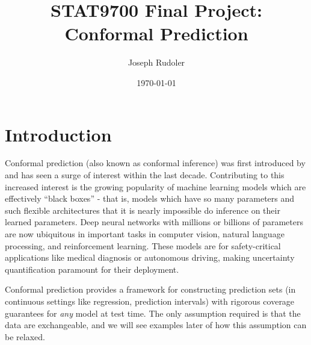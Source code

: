 \documentclass[a4paper, 12pt]{article}
\title{STAT9700 Final Project: Conformal Prediction}
\author{Joseph Rudoler}
\date{\today}
\begin{document}
\maketitle


\section*{Introduction}
Conformal prediction (also known as conformal inference) was first introduced by \textcite{vovkMachineLearningApplicationsAlgorithmic1999} and has seen a surge of interest within the last decade. Contributing to this increased interest is the growing popularity of machine learning models which are effectively ``black boxes'' - that is, models which have so many parameters and such flexible architectures that it is nearly impossible do inference on their learned parameters. Deep neural networks with millions or billions of parameters are now ubiquitous in important tasks in computer vision, natural language processing, and reinforcement learning. These models are for safety-critical applications like medical diagnosis or autonomous driving, making uncertainty quantification paramount for their deployment.

Conformal prediction provides a framework for constructing prediction sets (in continuous settings like regression, prediction intervals) with rigorous coverage guarantees for \textit{any} model at test time. The only assumption required is that the data are exchangeable, and we will see examples later of how this assumption can be relaxed.
\end{document}
